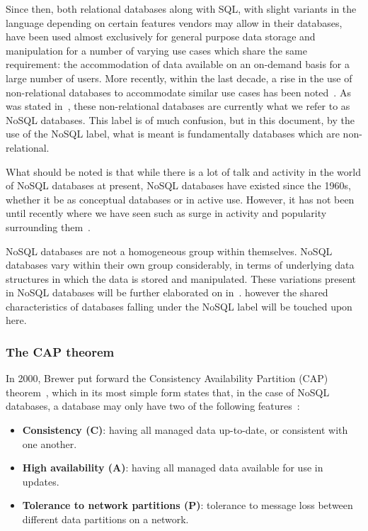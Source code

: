\documentclass{article}
\begin{document}
Since then, both relational databases along with SQL, with slight variants in the language depending on certain features
vendors may allow in their databases, have been used almost exclusively for general purpose data storage
and manipulation for a number of varying use cases which share the same requirement: the accommodation of data
available on an on-demand basis for a large number of users. More recently, within the last decade, a rise
in the use of non-relational databases to accommodate similar use cases has been noted~\cite{padhy2011rdbms}.
As was stated in~, these non-relational databases are currently what we refer to
as NoSQL databases. This label is of much confusion, but in this document, by the use of the NoSQL label, what
is meant is fundamentally databases which are non-relational.

What should be noted is that while there is a lot of talk and activity in the world of NoSQL databases at
present, NoSQL databases have existed since the 1960s, whether it be as conceptual databases or in active use.
However, it has not been until recently where we have seen such as surge in activity and popularity
surrounding them~\cite{leavitt2010will}.

NoSQL databases are not a homogeneous group within themselves. NoSQL databases vary within their own group
considerably, in terms of underlying data structures in which the data is stored and manipulated. These
variations present in NoSQL databases will be further elaborated on in~.
however the shared characteristics of databases falling under the NoSQL label will be touched upon here.

\subsubsection{The CAP theorem} %
\label{ssub:cap_theorem}

In 2000, Brewer put forward the Consistency Availability Partition (CAP) theorem~\cite{brewer2000towards}, which in its most simple form
states that, in the case of NoSQL databases, a database may only have two of the following features~\cite{brewer2012pushing}:

\begin{itemize}
    \item \textbf{Consistency (C)}: having all managed data up-to-date, or consistent with one another.
    \item \textbf{High availability (A)}: having all managed data available for use in updates.
    \item \textbf{Tolerance to network partitions (P)}: tolerance to message loss between different data partitions on a network.
\end{itemize}
\end{document}
